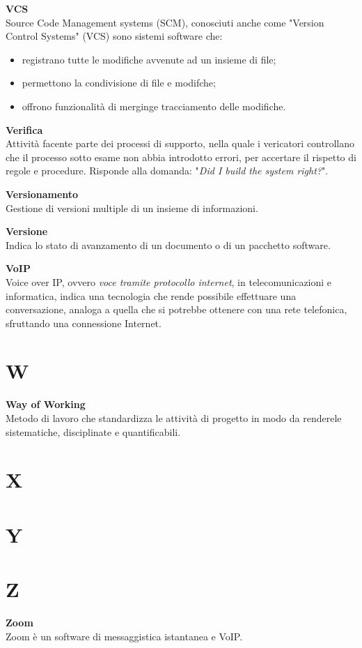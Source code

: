 \documentclass[a4paper, oneside, openany, dvipsnames, table, 12pt]{article}
\begin{document}
\textbf{VCS} \\
Source Code Management systems (SCM), conosciuti anche come "Version Control Systems" (VCS) sono sistemi software che: \begin{itemize}
\item registrano tutte le modifiche avvenute ad un insieme di file;
\item permettono la condivisione di file e modifche;
\item offrono funzionalità di merging\glo e tracciamento delle modifiche.
\end{itemize}

\textbf{Verifica} \\
Attività facente parte dei processi di supporto, nella quale i vericatori controllano che il processo sotto esame non abbia introdotto errori, per accertare il rispetto di regole e procedure. Risponde alla domanda: "\textit{Did I build the system right?}".

\textbf{Versionamento} \\
Gestione di versioni multiple di un insieme di informazioni.

\textbf{Versione} \\
Indica lo stato di avanzamento di un documento o di un pacchetto software.

\textbf{VoIP} \\
Voice over IP, ovvero \textit{voce tramite protocollo internet}, in telecomunicazioni e informatica, indica una tecnologia che rende possibile effettuare una conversazione, analoga a quella che si potrebbe ottenere con una rete telefonica, sfruttando una connessione Internet.

\newpage
\section{W}
\textbf{Way of Working} \\
Metodo di lavoro che standardizza le attività di progetto in modo da renderele sistematiche, disciplinate e quantificabili.

\newpage
\section{X}

\newpage
\section{Y}

\newpage
\section{Z}
\textbf{Zoom} \\
Zoom è un software di messaggistica istantanea e VoIP\glo. 
\end{document}
